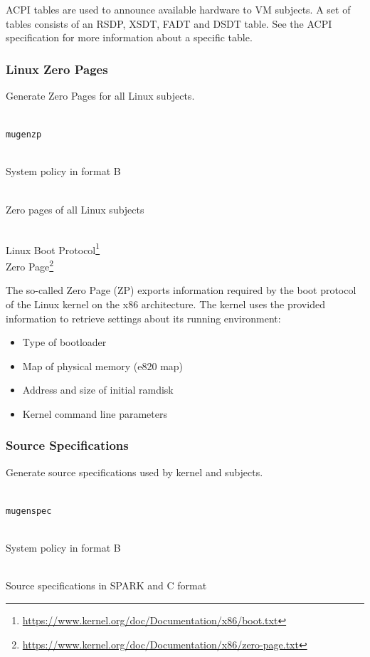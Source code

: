 \documentclass[a4paper,twoside,titlepage]{article}
\begin{document}
ACPI tables are used to announce available hardware to VM subjects. A set of
tables consists of an RSDP, XSDT, FADT and DSDT table. See the ACPI
specification for more information about a specific table.

\subsubsection{Linux Zero Pages}
Generate Zero Pages for all Linux subjects.

\begin{description} \itemsep1pt \parskip0pt
	\item[Name] \hfill \\
		\texttt{mugenzp}
	\item[Input] \hfill \\
		System policy in format B
	\item[Output] \hfill \\
		Zero pages of all Linux subjects
	\item[Output format] \hfill \\
		Linux Boot Protocol\footnote{\url{https://www.kernel.org/doc/Documentation/x86/boot.txt}} \\
		Zero Page\footnote{\url{https://www.kernel.org/doc/Documentation/x86/zero-page.txt}}
\end{description}

The so-called Zero Page (ZP) exports information required by the boot protocol
of the Linux kernel on the x86 architecture. The kernel uses the provided
information to retrieve settings about its running environment:
\begin{itemize}
	\item Type of bootloader
	\item Map of physical memory (e820 map)
	\item Address and size of initial ramdisk
	\item Kernel command line parameters
\end{itemize}

\subsubsection{Source Specifications}
\label{sec:tools-gen-spec}
Generate source specifications used by kernel and subjects.

\begin{description} \itemsep1pt \parskip0pt
	\item[Name] \hfill \\
		\texttt{mugenspec}
	\item[Input] \hfill \\
		System policy in format B
	\item[Output] \hfill \\
		Source specifications in SPARK and C format
\end{description}
\end{document}
